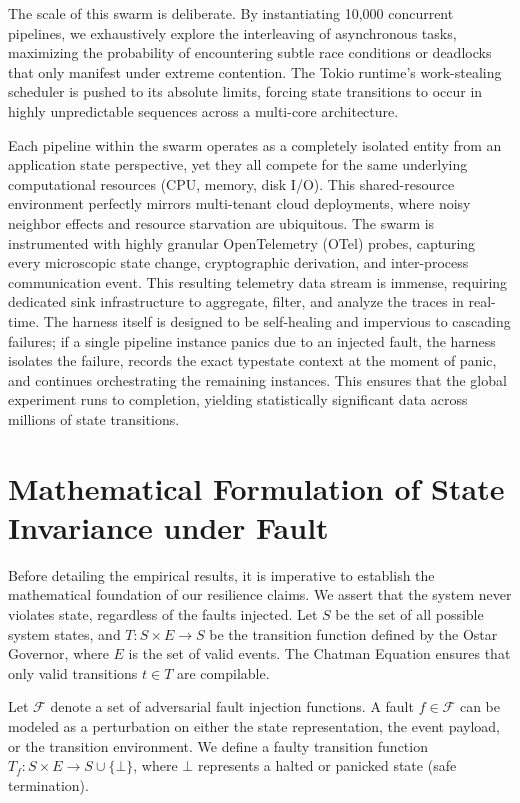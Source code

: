 The scale of this swarm is deliberate. By instantiating 10,000 concurrent pipelines, we exhaustively explore the interleaving of asynchronous tasks, maximizing the probability of encountering subtle race conditions or deadlocks that only manifest under extreme contention. The Tokio runtime's work-stealing scheduler is pushed to its absolute limits, forcing state transitions to occur in highly unpredictable sequences across a multi-core architecture. 

Each pipeline within the swarm operates as a completely isolated entity from an application state perspective, yet they all compete for the same underlying computational resources (CPU, memory, disk I/O). This shared-resource environment perfectly mirrors multi-tenant cloud deployments, where noisy neighbor effects and resource starvation are ubiquitous. The swarm is instrumented with highly granular OpenTelemetry (OTel) probes, capturing every microscopic state change, cryptographic derivation, and inter-process communication event. This resulting telemetry data stream is immense, requiring dedicated sink infrastructure to aggregate, filter, and analyze the traces in real-time. The harness itself is designed to be self-healing and impervious to cascading failures; if a single pipeline instance panics due to an injected fault, the harness isolates the failure, records the exact typestate context at the moment of panic, and continues orchestrating the remaining instances. This ensures that the global experiment runs to completion, yielding statistically significant data across millions of state transitions.

\section{Mathematical Formulation of State Invariance under Fault}

Before detailing the empirical results, it is imperative to establish the mathematical foundation of our resilience claims. We assert that the system never violates state, regardless of the faults injected. Let $S$ be the set of all possible system states, and $T: S \times E \rightarrow S$ be the transition function defined by the Ostar Governor, where $E$ is the set of valid events. The Chatman Equation ensures that only valid transitions $t \in T$ are compilable.

Let $\mathcal{F}$ denote a set of adversarial fault injection functions. A fault $f \in \mathcal{F}$ can be modeled as a perturbation on either the state representation, the event payload, or the transition environment. We define a faulty transition function $T_f: S \times E \rightarrow S \cup \{\bot\}$, where $\bot$ represents a halted or panicked state (safe termination).

